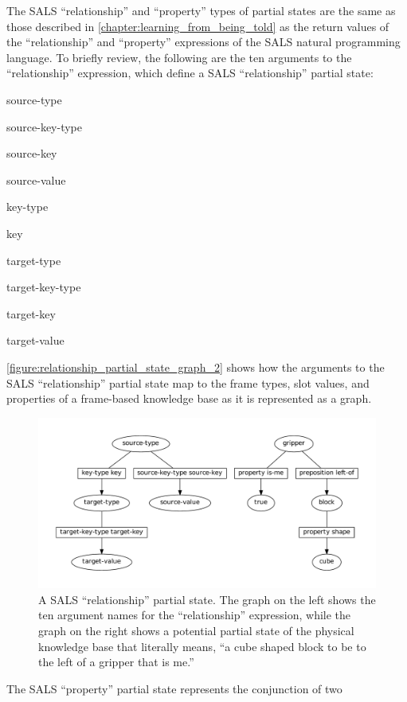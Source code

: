 The SALS ``relationship'' and ``property'' types of partial states are
the same as those described in
{\mbox{\autoref{chapter:learning_from_being_told}}}
as the return values of the ``relationship'' and ``property''
expressions of the SALS natural programming language.  To briefly
review, the following are the ten arguments to the ``relationship''
expression, which define a SALS ``relationship'' partial state:
\begin{packed_enumerate}
\item{source-type}
\item{source-key-type}
\item{source-key}
\item{source-value}
\item{key-type}
\item{key}
\item{target-type}
\item{target-key-type}
\item{target-key}
\item{target-value}
\end{packed_enumerate}
{\mbox{\autoref{figure:relationship_partial_state_graph_2}}} shows how
the arguments to the SALS ``relationship'' partial state map to the
frame types, slot values, and properties of a frame-based knowledge
base as it is represented as a graph.
\begin{figure}
\centering
\includegraphics[width=12cm]{gfx/relationship_partial_state_graph}
\caption[A SALS ``relationship'' partial state.]{A SALS
  ``relationship'' partial state.  The graph on the left shows the ten
  argument names for the ``relationship'' expression, while the graph
  on the right shows a potential partial state of the physical
  knowledge base that literally means, ``a cube shaped block to be to
  the left of a gripper that is me.''}
\label{figure:relationship_partial_state_graph_2}
\end{figure}
The SALS ``property'' partial state represents the conjunction of two
